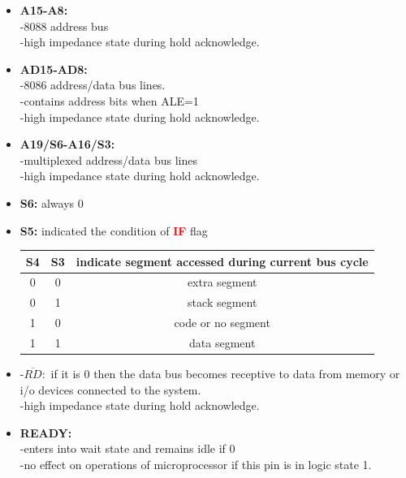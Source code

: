 \documentclass[12pt]{article}
\begin{document}
\begin{itemize}
\begin{itemize}
		\item \textbf{A15-A8:} \\
		-8088 address bus\\
		-high impedance state during hold acknowledge.\\
		
		\item \textbf{AD15-AD8:}\\
		-8086 address/data bus lines.\\
		-contains address bits when ALE=1\\
		-high impedance state during hold acknowledge.\\
		
		\item \textbf{A19/S6-A16/S3:}\\
		-multiplexed address/data bus lines\\
		-high impedance state during hold acknowledge.\\
		
		\item\textbf{S6:} always 0\\
		\item\textbf{S5:} indicated the condition of \textbf{\textcolor{red}{IF}} flag\\
		
		\begin{table}[H]
			\centering
			\begin{tabular}{|c|c|c|}
				\hline
				S4 & S3 & indicate segment accessed  during current bus cycle\\\hline
				
				0 & 0 & extra segment\\\hline
				0 & 1 & stack segment\\\hline
				1 & 0 & code or no segment\\\hline
				1 & 1 & data segment\\\hline
			\end{tabular}
		\end{table}
	
		\item -$\overline{RD}:$ if it is 0 then the data bus becomes receptive to data from memory or i/o devices connected to the system.\\
		-high impedance state during hold acknowledge.\\
		
		\item\textbf{READY:}\\
		-enters into wait state and remains idle if 0\\
		-no effect on operations of microprocessor if this pin is in logic state 1.\\
		

\end{itemize}
\end{itemize}
\end{document}
